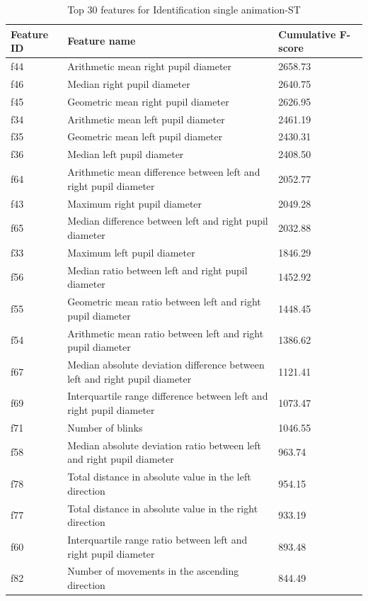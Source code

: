 \documentclass{article}
\begin{document}
\begin{table}[htbp]
\centering
\scriptsize
\setlength{\tabcolsep}{3pt}
\caption{Top 30 features for Identification single animation-ST}
\label{tab:top30_id_s_st}
\begin{tabular}{lll}
\toprule
\textbf{Feature ID} & \textbf{Feature name} & \textbf{Cumulative F-score} \\
\midrule
f44 & Arithmetic mean right pupil diameter & 2658.73 \\
f46 & Median right pupil diameter & 2640.75 \\
f45 & Geometric mean right pupil diameter & 2626.95 \\
f34 & Arithmetic mean left pupil diameter & 2461.19 \\
f35 & Geometric mean left pupil diameter & 2430.31 \\
f36 & Median left pupil diameter & 2408.50 \\
f64 & Arithmetic mean difference between left and right pupil diameter & 2052.77 \\
f43 & Maximum right pupil diameter & 2049.28 \\
f65 & Median difference between left and right pupil diameter & 2032.88 \\
f33 & Maximum left pupil diameter & 1846.29 \\
f56 & Median ratio between left and right pupil diameter & 1452.92 \\
f55 & Geometric mean ratio between left and right pupil diameter & 1448.45 \\
f54 & Arithmetic mean ratio between left and right pupil diameter & 1386.62 \\
f67 & Median absolute deviation difference between left and right pupil diameter & 1121.41 \\
f69 & Interquartile range difference between left and right pupil diameter & 1073.47 \\
f71 & Number of blinks & 1046.55 \\
f58 & Median absolute deviation ratio between left and right pupil diameter & 963.74 \\
f78 & Total distance in absolute value in the left direction & 954.15 \\
f77 & Total distance in absolute value in the right direction & 933.19 \\
f60 & Interquartile range ratio between left and right pupil diameter & 893.48 \\
f82 & Number of movements in the ascending direction & 844.49 \\

\end{tabular}
\end{table}
\end{document}
